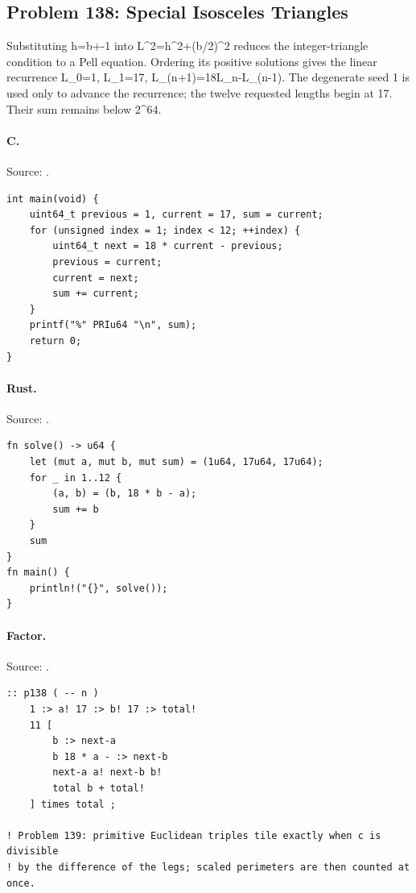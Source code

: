 \subsection{Problem 138: Special Isosceles Triangles}
\label{walkthrough:p138}
Substituting h=b+-1 into L\textasciicircum{}2=h\textasciicircum{}2+(b/2)\textasciicircum{}2 reduces the integer-triangle condition to a Pell equation. Ordering its positive solutions gives the linear recurrence L\_0=1, L\_1=17, L\_(n+1)=18L\_n-L\_(n-1). The degenerate seed 1 is used only to advance the recurrence; the twelve requested lengths begin at 17. Their sum remains below 2\textasciicircum{}64.

\paragraph{C.} Source: .
\begin{lstlisting}
int main(void) {
    uint64_t previous = 1, current = 17, sum = current;
    for (unsigned index = 1; index < 12; ++index) {
        uint64_t next = 18 * current - previous;
        previous = current;
        current = next;
        sum += current;
    }
    printf("%" PRIu64 "\n", sum);
    return 0;
}
\end{lstlisting}

\paragraph{Rust.} Source: .
\begin{lstlisting}
fn solve() -> u64 {
    let (mut a, mut b, mut sum) = (1u64, 17u64, 17u64);
    for _ in 1..12 {
        (a, b) = (b, 18 * b - a);
        sum += b
    }
    sum
}
fn main() {
    println!("{}", solve());
}
\end{lstlisting}

\paragraph{Factor.} Source: .
\begin{lstlisting}
:: p138 ( -- n )
    1 :> a! 17 :> b! 17 :> total!
    11 [
        b :> next-a
        b 18 * a - :> next-b
        next-a a! next-b b!
        total b + total!
    ] times total ;

! Problem 139: primitive Euclidean triples tile exactly when c is divisible
! by the difference of the legs; scaled perimeters are then counted at once.
\end{lstlisting}


